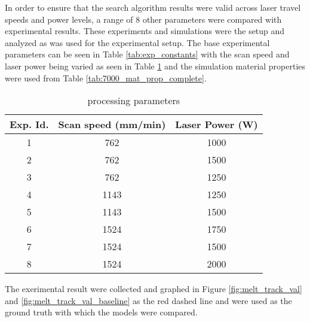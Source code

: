 \label{validation}

In order to ensure that the search algorithm results were valid across laser travel speeds and power levels, a range of 8 other parameters were compared with experimental results.
These experiments and simulations were the setup and analyzed as was used for the  experimental setup.  The base experimental parameters can be seen in Table \ref{tab:exp_constants} with the scan speed and laser power being varied as seen in Table \ref{tab:val_parameters} and the simulation material properties were used from Table \ref{tab:7000_mat_prop_complete}.
\begin{table}[!htb]
	\centering
	\caption{ processing parameters}
	\label{tab:val_parameters}
		\begin{tabular}{|c|c|c|} \hline 
			Exp. Id. & Scan speed (mm/min) & Laser Power (W) \\ \hline
			1 & 762 & 1000 \\ \hline  %
			2 & 762 & 1500 \\ \hline  %
			3 & 762 & 1250 \\ \hline  %
			4 & 1143 & 1250 \\ \hline %
			5 & 1143 & 1500 \\ \hline  %
			6 & 1524 & 1750 \\ \hline  %
			7 & 1524 & 1500 \\ \hline  %
			8 & 1524 & 2000 \\ \hline  %
		\end{tabular}
\end{table}
The exerimental result were collected and graphed in Figure \ref{fig:melt_track_val} and \ref{fig:melt_track_val_baseline} as the red dashed line and were used as the ground truth with which the models were compared.

